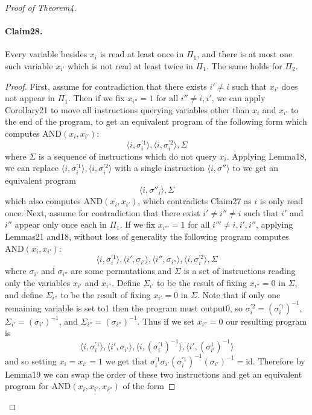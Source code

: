 \begin{proof}[Proof of Theorem4]
\paragraph{Claim28.} Every variable besides $x_i$ is read at least once in $\Pi_1$, and there is at most one such variable $x_{i'}$ which is not read at least twice in $\Pi_1$. The same holds for $\Pi_2$.
\begin{proof}
First, assume for contradiction that there exists $i'\neq i$ such that $x_{i'}$ does not appear in $\Pi_1$. Then if we fix $x_{i''}=1$ for all $i''\neq i,i'$, we can apply Corollary21 to move all instructions querying variables other than $x_i$ and $x_{i'}$ to the end of the program, to get an equivalent program of the following form which computes $\mathrm{AND}(x_i,x_{i'})$:
\[\langle i,\sigma_i^{\prime1}\rangle,\langle i,\sigma_i^{\prime2}\rangle,\Sigma\]
where $\Sigma$ is a sequence of instructions which do not query $x_i$. Applying Lemma18, we can replace $\langle i,\sigma_i^{\prime1}\rangle,\langle i,\sigma_i^{\prime2}\rangle$ with a single instruction $\langle i,\sigma''\rangle$ to we get an equivalent program
\[\langle i,\sigma''_i\rangle,\Sigma\]
which also computes $\mathrm{AND}(x_i,x_{i'})$, which contradicts Claim27 as $i$ is only read once.
Next, assume for contradiction that there exist $i'\neq i''\neq i$ such that $i'$ and $i''$ appear only once each in $\Pi_1$. If we fix $x_{i'''}=1$ for all $i'''\neq i,i',i''$, applying Lemmas21 and18, without loss of generality the following program computes $\mathrm{AND}(x_i,x_{i'})$:
\[\langle i,\sigma_i^{\prime1}\rangle,\langle i',\sigma_{i'}\rangle,\langle i'',\sigma_{i''}\rangle,\langle i,\sigma_i^{\prime2}\rangle,\Sigma\]
where $\sigma_{i'}$ and $\sigma_{i''}$ are some permutations and $\Sigma$ is a set of instructions reading only the variables $x_{i'}$ and $x_{i''}$.
Define $\Sigma_{i'}$ to be the result of fixing $x_{i''}=0$ in $\Sigma$, and define $\Sigma_{i''}$ to be the result of fixing $x_{i'}=0$ in $\Sigma$. Note that if only one remaining variable is set to1 then the program must output0, so $\sigma_i^{\prime2}=(\sigma_i^{\prime1})^{-1}$, $\Sigma_{i'}=(\sigma_{i'})^{-1}$, and $\Sigma_{i''}=(\sigma_{i''})^{-1}$. Thus if we set $x_{i''}=0$ our resulting program is
\[\langle i,\sigma_i^{\prime1}\rangle,\langle i',\sigma_{i'}\rangle,\langle i,(\sigma_i^{\prime1})^{-1}\rangle,\langle i',(\sigma_{i'}^1)^{-1}\rangle\]
and so setting $x_i=x_{i'}=1$ we get that $\sigma_i^{\prime1}\sigma_{i'}(\sigma_i^{\prime1})^{-1}(\sigma_{i'})^{-1}=\mathrm{id}$. Therefore by Lemma19 we can swap the order of these two instructions and get an equivalent program for $\mathrm{AND}(x_i,x_{i'},x_{i''})$ of the form

\end{proof}
\end{proof}
